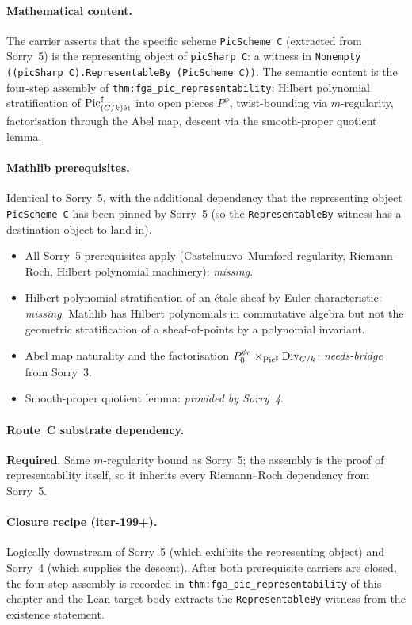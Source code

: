 \paragraph{Mathematical content.} The carrier asserts that the
specific scheme \texttt{PicScheme C} (extracted from Sorry~5) is the
representing object of \texttt{picSharp C}: a witness in
\texttt{Nonempty ((picSharp C).RepresentableBy (PicScheme C))}. The
semantic content is the four-step assembly of
\texttt{thm:fga_pic_representability}: Hilbert polynomial
stratification of $\operatorname{Pic}^\sharp_{(C/k)\mathrm{\acute{e}t}}$ into open pieces
$P^\phi$, twist-bounding via $m$-regularity, factorisation through
the Abel map, descent via the smooth-proper quotient lemma.

\paragraph{Mathlib prerequisites.}
Identical to Sorry~5, with the additional dependency that the
representing object \texttt{PicScheme C} has been pinned by Sorry~5
(so the \texttt{RepresentableBy} witness has a destination object to
land in).
\begin{itemize}
  \item All Sorry~5 prerequisites apply (Castelnuovo--Mumford
    regularity, Riemann--Roch, Hilbert polynomial machinery):
    \emph{missing}.
  \item Hilbert polynomial stratification of an \'etale sheaf by
    Euler characteristic: \emph{missing}. Mathlib has Hilbert
    polynomials in commutative algebra but not the geometric stratification
    of a sheaf-of-points by a polynomial invariant.
  \item Abel map naturality and the factorisation
    $P^{\phi_0}_0 \times_{\operatorname{Pic}^\sharp} \mathrm{Div}_{C/k}$:
    \emph{needs-bridge} from Sorry~3.
  \item Smooth-proper quotient lemma: \emph{provided by Sorry~4}.
\end{itemize}

\paragraph{Route~C substrate dependency.} \textbf{Required}. Same
$m$-regularity bound as Sorry~5; the assembly is the proof of
representability itself, so it inherits every Riemann--Roch
dependency from Sorry~5.

\paragraph{Closure recipe (iter-199+).} Logically downstream of
Sorry~5 (which exhibits the representing object) and Sorry~4 (which
supplies the descent). After both prerequisite carriers are closed,
the four-step assembly is recorded in
\texttt{thm:fga_pic_representability} of this chapter and the Lean
target body extracts the \texttt{RepresentableBy} witness from the
existence statement.

